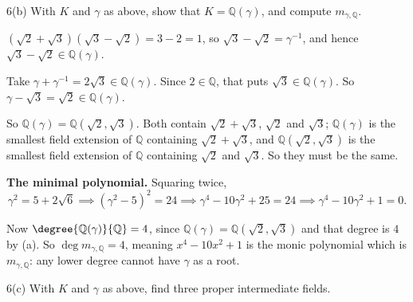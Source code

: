 \documentclass[11pt]{article}
\begin{document}
\begin{problem}{6(b)}
  With $K$ and $\gamma$ as above, show that $K = \mathbb{Q}(\gamma)$, and
  compute $m_{\gamma,\mathbb{Q}}$.
\end{problem}

\begin{solution}
  $(\sqrt{2}+\sqrt{3})(\sqrt{3}-\sqrt{2}) = 3 - 2 = 1$, so
  $\sqrt{3}-\sqrt{2} = \gamma^{-1}$, and hence
  $\sqrt{3}-\sqrt{2} \in \mathbb{Q}(\gamma)$.

  Take $\gamma + \gamma^{-1} = 2\sqrt{3} \in \mathbb{Q}(\gamma)$. Since
  $2 \in \mathbb{Q}$, that puts $\sqrt{3} \in \mathbb{Q}(\gamma)$. So
  $\gamma - \sqrt{3} = \sqrt{2} \in \mathbb{Q}(\gamma)$.

  So $\mathbb{Q}(\gamma) = \mathbb{Q}(\sqrt{2},\sqrt{3})$. Both contain
  $\sqrt{2}+\sqrt{3}$, $\sqrt{2}$ and $\sqrt{3}$; $\mathbb{Q}(\gamma)$ is the
  smallest field extension of $\mathbb{Q}$ containing $\sqrt{2}+\sqrt{3}$, and
  $\mathbb{Q}(\sqrt{2},\sqrt{3})$ is the smallest field extension of
  $\mathbb{Q}$ containing $\sqrt{2}$ and $\sqrt{3}$. So they must be the same.

  \medskip
  \textbf{The minimal polynomial.} Squaring twice,
  \[
    \gamma^{2} = 5 + 2\sqrt{6}
    \implies (\gamma^{2}-5)^{2} = 24
    \implies \gamma^{4} - 10\gamma^{2} + 25 = 24
    \implies \gamma^{4} - 10\gamma^{2} + 1 = 0 .
  \]

  Now $\degree{\mathbb{Q}(\gamma)}{\mathbb{Q}} = 4$, since
  $\mathbb{Q}(\gamma) = \mathbb{Q}(\sqrt{2},\sqrt{3})$ and that degree is $4$ by
  (a). So $\deg m_{\gamma,\mathbb{Q}} = 4$, meaning $x^{4} - 10x^{2} + 1$ is the
  monic polynomial which is $m_{\gamma,\mathbb{Q}}$: any lower degree cannot have
  $\gamma$ as a root.
\end{solution}

\begin{problem}{6(c)}
  With $K$ and $\gamma$ as above, find three proper intermediate fields.
\end{problem}
\end{document}
